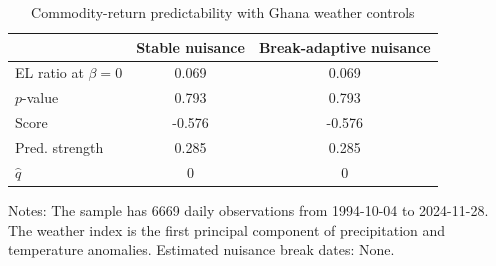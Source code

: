 \begin{table}[t]
\centering
\caption{Commodity-return predictability with Ghana weather controls}
\label{tab:ghana-empirical}
\begin{tabular}{lcc}
\hline
 & Stable nuisance & Break-adaptive nuisance \\
\hline
EL ratio at $\beta=0$ & 0.069 & 0.069 \\
$p$-value & 0.793 & 0.793 \\
Score & -0.576 & -0.576 \\
Pred. strength & 0.285 & 0.285 \\
$\widehat q$ & 0 & 0 \\
\hline
\end{tabular}
\begin{minipage}{0.94\linewidth}
\footnotesize Notes: The sample has 6669 daily observations from 1994-10-04 to 2024-11-28. The weather index is the first principal component of precipitation and temperature anomalies. Estimated nuisance break dates: None.
\end{minipage}
\end{table}
